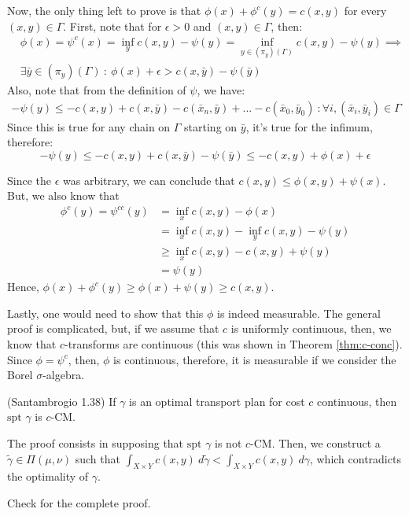\begin{prf}
  Now, the only thing left to prove is that $\phi(x)+\phi^c(y) = c(x,y)$ for every $(x,y) \in \Gamma$.
  First, note that for $\epsilon > 0$ and $(x,y) \in \Gamma$, then:
  \begin{align*}
    &\phi(x) = \psi^c(x) = \inf_y c(x,y) - \psi(y) =
    \inf_{y \in (\pi_y)(\Gamma)} c(x,y) - \psi(y)
    \implies \\
    &\exists \bar y \in (\pi_y)(\Gamma) \ : \
    \phi(x)+ \epsilon > c(x,\bar y) - \psi(\bar y)
  \end{align*}
  Also, note that from the definition of $\psi$, we have:
  \begin{align*}
    -\psi(y) \leq -c(x,y) + c(x,\bar y) - c(\bar x_n, \bar y) + ... - c(\bar x_0, \bar y_0)
    \ : \forall i, (\bar x_i, \bar y_i) \in \Gamma
  \end{align*}
  Since this is true for any chain on $\Gamma$ starting on $\bar y$, it's true for the infimum, therefore:
  \begin{equation*}
    -\psi(y) \leq -c(x,y) + c(x,\bar y) - \psi(\bar y) \leq -c(x,y) + \phi(x) + \epsilon
  \end{equation*}

  Since the $\epsilon$ was arbitrary, we can conclude that
  $c(x,y) \leq \phi(x,y) + \psi(x)$. But, we also know that
  \begin{align*}
    \phi^c(y) = \psi^{c c}(y) & = \inf_x c(x,y) - \phi(x)                 \\
                              & = \inf_x c(x,y) - \inf_y c(x,y) - \psi(y) \\
                              & \geq \inf_x c(x,y) - c(x,y) + \psi(y)     \\
                              & = \psi(y)
  \end{align*}
  Hence, $\phi(x)+\phi^c(y) \geq \phi(x) + \psi(y) \geq c(x,y)$.

  Lastly, one would need to show that this $\phi$ is indeed measurable. The general proof is complicated,
  but, if we assume that $c$ is uniformly continuous, then, we know that $c$-transforms are continuous (this was
  shown in Theorem \ref{thm:c-conc}). Since $\phi = \psi^c$, then, $\phi$ is continuous, therefore, it is measurable
  if we consider the Borel $\sigma$-algebra.
\end{prf}

\begin{theorem} (Santambrogio 1.38)
  If $\gamma$ is an optimal transport plan for cost $c$ continuous,
  then $\text{spt } \gamma$ is $c$-CM.
  \label{thm:gamma-cCM}
\end{theorem}
\begin{prf}
  The proof consists in supposing that $\text{spt } \gamma$ is not $c$-CM. Then, we construct a
  $\tilde \gamma \in \Pi(\mu,\nu)$ such that $\int_{X\times Y} c(x,y) \ d\tilde\gamma <
    \int_{X \times Y} c(x,y) \ d\gamma$, which contradicts the optimality of $\gamma$.

  Check \citet{santambrogio2015optimal} for the complete proof.
\end{prf}


